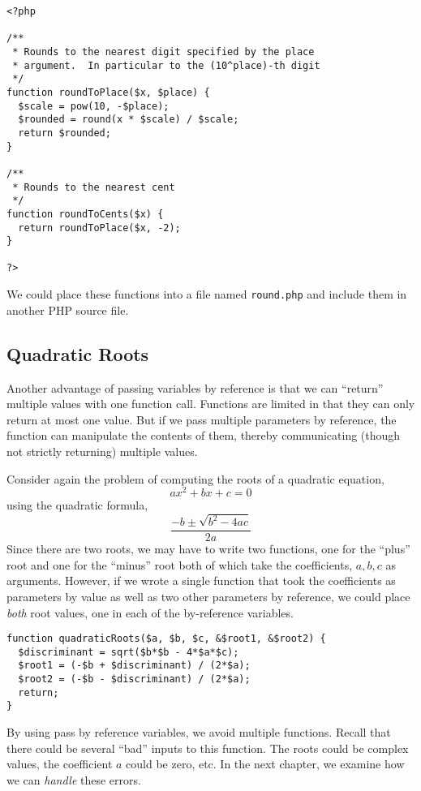 \begin{verbatim}
<?php

/**
 * Rounds to the nearest digit specified by the place
 * argument.  In particular to the (10^place)-th digit
 */
function roundToPlace($x, $place) {
  $scale = pow(10, -$place);
  $rounded = round(x * $scale) / $scale;
  return $rounded;
}

/**
 * Rounds to the nearest cent
 */
function roundToCents($x) {
  return roundToPlace($x, -2);
}

?>
\end{verbatim}

We could place these functions into a file named \texttt{round.php}
and include them in another PHP source file.

\subsection{Quadratic Roots}

Another advantage of passing variables by reference is that we
can ``return'' multiple values with one function call.  Functions
are limited in that they can only return at most one value.  But
if we pass multiple parameters by reference, the function can
manipulate the contents of them, thereby communicating (though
not strictly returning) multiple values.  

Consider again the problem of computing the roots of a quadratic
equation, 
  $$ax^2 + bx + c = 0$$
using the quadratic formula,
 $$\frac{-b \pm \sqrt{b^2 - 4ac}}{2a}$$
Since there are two roots, we may have to write two functions, 
one for the ``plus'' root and one for the ``minus'' root both of 
which take the coefficients, $a, b, c$ as arguments.  However,
if we wrote a single function that took the coefficients as parameters
by value as well as two other parameters by reference, we could
place \emph{both} root values, one in each of the by-reference
variables.

\begin{verbatim}
function quadraticRoots($a, $b, $c, &$root1, &$root2) {
  $discriminant = sqrt($b*$b - 4*$a*$c);
  $root1 = (-$b + $discriminant) / (2*$a);
  $root2 = (-$b - $discriminant) / (2*$a);
  return;
}
\end{verbatim}

By using pass by reference variables, we avoid multiple functions.
Recall that there could be several ``bad'' inputs to this function.  The 
roots could be complex values, the coefficient $a$ could be zero, 
etc.  In the next chapter, we examine how we can \emph{handle}
these errors.






